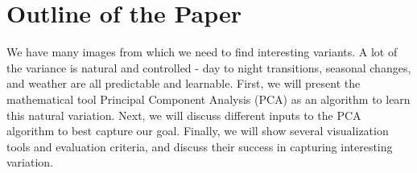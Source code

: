 \section{Outline of the Paper}

We have many images from which we need to find interesting variants.  A lot of the variance is natural and controlled - day to night transitions, seasonal changes, and weather are all predictable and learnable.  First, we will present the mathematical tool Principal Component Analysis (PCA) as an algorithm to learn this natural variation.  Next, we will discuss different inputs to the PCA algorithm to best capture our goal.  Finally, we will show several visualization tools and evaluation criteria, and discuss their success in capturing interesting variation.


